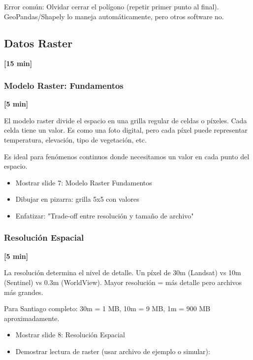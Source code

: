 \documentclass[11pt,a4paper]{article}
\newcommand{\tiempo}[1]{\textcolor{timecolor}{\textbf{[#1]}}}
\newcommand{\decir}[1]{\begin{tcolorbox}[colback=blue!5,colframe=usachblue,title={DECIR}]#1\end{tcolorbox}}
\newcommand{\hacer}[1]{\begin{tcolorbox}[colback=green!5,colframe=green!50!black,title={HACER}]#1\end{tcolorbox}}
\newcommand{\alerta}[1]{\begin{tcolorbox}[colback=red!5,colframe=red,title={ALERTA}]#1\end{tcolorbox}}
\begin{document}
\alerta{
Error común: Olvidar cerrar el polígono (repetir primer punto al final).
GeoPandas/Shapely lo maneja automáticamente, pero otros software no.
}

\subsection{Datos Raster} \tiempo{15 min}

\subsubsection{Modelo Raster: Fundamentos} \tiempo{5 min}

\decir{
El modelo raster divide el espacio en una grilla regular de celdas o píxeles. Cada celda tiene un valor. Es como una foto digital, pero cada píxel puede representar temperatura, elevación, tipo de vegetación, etc.

Es ideal para fenómenos continuos donde necesitamos un valor en cada punto del espacio.
}

\hacer{
\begin{itemize}
    \item Mostrar slide 7: Modelo Raster Fundamentos
    \item Dibujar en pizarra: grilla 5x5 con valores
    \item Enfatizar: "Trade-off entre resolución y tamaño de archivo"
\end{itemize}
}

\subsubsection{Resolución Espacial} \tiempo{5 min}

\decir{
La resolución determina el nivel de detalle. Un píxel de 30m (Landsat) vs 10m (Sentinel) vs 0.3m (WorldView). Mayor resolución = más detalle pero archivos más grandes.

Para Santiago completo: 30m = 1 MB, 10m = 9 MB, 1m = 900 MB aproximadamente.
}

\hacer{
\begin{itemize}
    \item Mostrar slide 8: Resolución Espacial
    \item Demostrar lectura de raster (usar archivo de ejemplo o simular):
\end{itemize}
}
\end{document}
